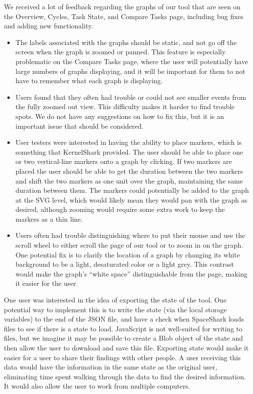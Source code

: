 \documentclass{hmcclinic}
\begin{document}
We received a lot of feedback regarding the graphs of our tool that are seen on the Overview, Cycles, Task State, and Compare Tasks page, including bug fixes and adding new functionality.
  \begin{itemize}

  \item The labels associated with the graphs should be static, and not go off the screen when 
  the graph is zoomed or panned. This feature is especially problematic on the Compare Tasks page, 
  where the user will potentially have large numbers of graphs displaying, and it will be 
  important for them to not have to remember what each graph is displaying.

  \item Users found that they often had trouble or could not see smaller events 
  from the fully zoomed out view. This difficulty makes it harder to find trouble spots. We do not 
  have any suggestions on how to fix this, but it is an important issue that should be 
  considered.

  \item User testers were interested in having the ability to place markers, which 
  is something that KernelShark provided. The user should be able to place one or two
   vertical-line markers onto a graph by clicking. If two markers are placed the user should
    be able to get the duration between the two markers and shift the two markers as one
     unit over the graph, maintaining the same duration between them. The markers could
      potentially be added to the graph at the SVG level, which would likely mean they 
      would pan with the graph as desired, although zooming would require some extra 
      work to keep the markers as a thin line.

  \item Users often had trouble distinguishing where to put their mouse and use the scroll wheel to either scroll the page of our tool or to zoom in on the graph. One potential fix is to clarify the location of a graph by changing its white background
     to be a light, desaturated color or a light grey. This contrast would make the
     graph's ``white
      space'' distinguishable from the page, making it easier for the user.

  \end{itemize}

One user was interested in the idea of exporting the state of the tool. One
potential way to implement this is to write the state (via the local storage
variables) to the end of the JSON file, and have a check when SpaceShark loads files to
see if there is a state to load. JavaScript is not
well-suited for writing to files, but we imagine it may be possible to
create a Blob object of the state and then allow the user to download and save
this file.  Exporting state would make it easier for a user to share their
findings with other people. A user receiving this data would have the
information in the same state as the original user, eliminating time spent
walking through the data to find the desired information. It would also allow
the user to work from multiple computers.
\end{document}
